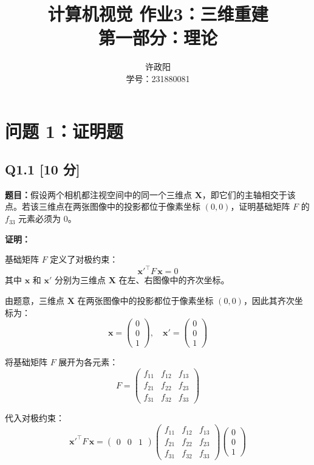 \documentclass[12pt, a4paper]{article}
\title{\textbf{计算机视觉 作业3：三维重建} \\ 第一部分：理论}
\author{许政阳 \\ 学号：231880081}
\date{}
\begin{document}
\maketitle

\section*{问题 1：证明题}

\subsection*{Q1.1 [10 分]}

\textbf{题目：}假设两个相机都注视空间中的同一个三维点 $\mathbf{X}$，即它们的主轴相交于该点。若该三维点在两张图像中的投影都位于像素坐标 $(0, 0)$，证明基础矩阵 $F$ 的 $f_{33}$ 元素必须为 $0$。

\bigskip
\textbf{证明：}

基础矩阵 $F$ 定义了对极约束：
\[
\mathbf{x}'^{\top} F \, \mathbf{x} = 0
\]
其中 $\mathbf{x}$ 和 $\mathbf{x}'$ 分别为三维点 $\mathbf{X}$ 在左、右图像中的齐次坐标。

由题意，三维点 $\mathbf{X}$ 在两张图像中的投影都位于像素坐标 $(0,0)$，因此其齐次坐标为：
\[
\mathbf{x} = \begin{pmatrix} 0 \\ 0 \\ 1 \end{pmatrix}, \quad
\mathbf{x}' = \begin{pmatrix} 0 \\ 0 \\ 1 \end{pmatrix}
\]

将基础矩阵 $F$ 展开为各元素：
\[
F = \begin{pmatrix}
f_{11} & f_{12} & f_{13} \\
f_{21} & f_{22} & f_{23} \\
f_{31} & f_{32} & f_{33}
\end{pmatrix}
\]

代入对极约束：
\[
\mathbf{x}'^{\top} F \, \mathbf{x} =
\begin{pmatrix} 0 & 0 & 1 \end{pmatrix}
\begin{pmatrix}
f_{11} & f_{12} & f_{13} \\
f_{21} & f_{22} & f_{23} \\
f_{31} & f_{32} & f_{33}
\end{pmatrix}
\begin{pmatrix} 0 \\ 0 \\ 1 \end{pmatrix}
\]
\end{document}
